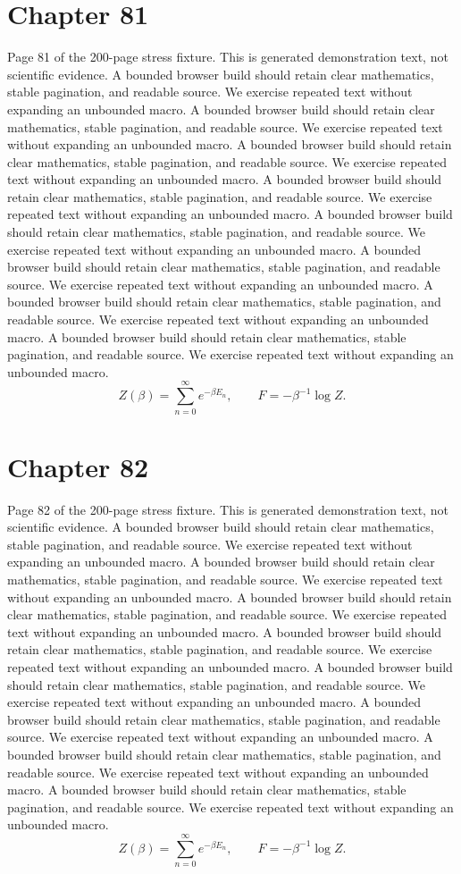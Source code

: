 \documentclass[11pt]{article}
\begin{document}
\section*{Chapter 81}
Page 81 of the 200-page stress fixture. This is generated demonstration text, not scientific evidence.
A bounded browser build should retain clear mathematics, stable pagination, and readable source. We exercise repeated text without expanding an unbounded macro.
A bounded browser build should retain clear mathematics, stable pagination, and readable source. We exercise repeated text without expanding an unbounded macro.
A bounded browser build should retain clear mathematics, stable pagination, and readable source. We exercise repeated text without expanding an unbounded macro.
A bounded browser build should retain clear mathematics, stable pagination, and readable source. We exercise repeated text without expanding an unbounded macro.
A bounded browser build should retain clear mathematics, stable pagination, and readable source. We exercise repeated text without expanding an unbounded macro.
A bounded browser build should retain clear mathematics, stable pagination, and readable source. We exercise repeated text without expanding an unbounded macro.
A bounded browser build should retain clear mathematics, stable pagination, and readable source. We exercise repeated text without expanding an unbounded macro.
A bounded browser build should retain clear mathematics, stable pagination, and readable source. We exercise repeated text without expanding an unbounded macro.
\[Z(\beta)=\sum_{n=0}^{\infty}e^{-\beta E_n},\qquad F=-\beta^{-1}\log Z.\]
\newpage
\section*{Chapter 82}
Page 82 of the 200-page stress fixture. This is generated demonstration text, not scientific evidence.
A bounded browser build should retain clear mathematics, stable pagination, and readable source. We exercise repeated text without expanding an unbounded macro.
A bounded browser build should retain clear mathematics, stable pagination, and readable source. We exercise repeated text without expanding an unbounded macro.
A bounded browser build should retain clear mathematics, stable pagination, and readable source. We exercise repeated text without expanding an unbounded macro.
A bounded browser build should retain clear mathematics, stable pagination, and readable source. We exercise repeated text without expanding an unbounded macro.
A bounded browser build should retain clear mathematics, stable pagination, and readable source. We exercise repeated text without expanding an unbounded macro.
A bounded browser build should retain clear mathematics, stable pagination, and readable source. We exercise repeated text without expanding an unbounded macro.
A bounded browser build should retain clear mathematics, stable pagination, and readable source. We exercise repeated text without expanding an unbounded macro.
A bounded browser build should retain clear mathematics, stable pagination, and readable source. We exercise repeated text without expanding an unbounded macro.
\[Z(\beta)=\sum_{n=0}^{\infty}e^{-\beta E_n},\qquad F=-\beta^{-1}\log Z.\]
\newpage
\end{document}
